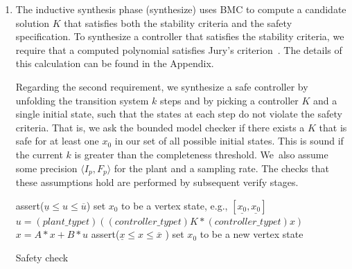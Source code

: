 \documentclass[twocolumn]{autart}    %
\begin{document}
\begin{enumerate}

\item The inductive synthesis phase ({\sc synthesize}) uses BMC to compute a
candidate solution $K$ that satisfies both the stability criteria and the
safety specification.  To synthesize a controller that satisfies the
stability criteria, we require that a computed polynomial satisfies Jury's
criterion~\cite{fadali}.  The details of this calculation can be found in
the Appendix.

Regarding the second requirement, we synthesize a safe controller by
unfolding the transition system $k$ steps and by picking a controller $K$
and a single initial state, such that the states at each step do not violate
the safety criteria.  That is, we ask the bounded model checker if there
exists a $K$ that is safe for at least one $x_0$ in our set of all possible
initial states.  This is sound if the current $k$ is greater than the completeness
threshold.  We~also assume some precision $\langle I_p,F_p\rangle$ for the
plant and a sampling rate.  The checks that these assumptions hold are
performed by subsequent {\sc verify} stages.



\begin{algorithm}[]
\begin{algorithmic}[1]
\State assert($ \underline{u}  \leq u \leq \overline{u}$)
 \State set $x_0$ to be a vertex state, e.g., $[\underline{x_0},\underline{x_0}]$	
		\State $u = (plant\_typet)((controller\_typet)K * (controller\_typet) x)$
		\State $x = A * x + B * u$
		\State assert($\underline{x} \leq x \leq \overline{x}$ )
  	\EndFor
  	\State set $x_0$ to be a new vertex state
  	\EndFor
\EndFunction
\end{algorithmic}
\caption{Safety check\label{alg:safetycheck}}
\end{algorithm}


\end{enumerate}
\end{document}
